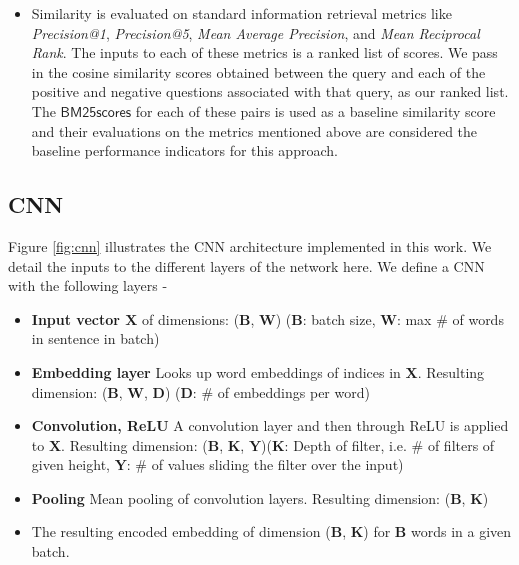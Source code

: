 \documentclass{sigkddExp}
\begin{document}
\begin{itemize}[topsep=0pt,itemsep=-1ex,partopsep=1ex,parsep=1ex]
  \item Similarity is evaluated on standard information retrieval metrics like \textit{Precision@1}, \textit{Precision@5}, \textit{Mean Average Precision}, and \textit{Mean Reciprocal Rank}. The inputs to each of these metrics is a ranked list of scores. We pass in the cosine similarity scores obtained between the query and each of the positive and negative questions associated with that query, as our ranked list. The $\mathsf{BM25 scores}$ for each of these pairs is used as a baseline similarity score and their evaluations on the metrics mentioned above are considered the baseline performance indicators for this approach.
\end{itemize}

\subsection{CNN}
Figure \ref{fig:cnn} illustrates the CNN architecture implemented in this work. We detail the inputs to the different layers of the network here.
We define a CNN with the following layers -
\begin{itemize}[topsep=0pt,itemsep=-1ex,partopsep=1ex,parsep=1ex]
\item \textbf{Input vector $\mathbf{X}$} of dimensions: ($\mathbf{B}$, $\mathbf{W}$) ($\mathbf{B}$: batch size, $\mathbf{W}$: max \# of words in sentence in batch)
\item \textbf{Embedding layer} Looks up word embeddings of indices in $\mathbf{X}$. Resulting dimension: ($\mathbf{B}$, $\mathbf{W}$, $\mathbf{D}$) ($\mathbf{D}$: \# of embeddings per word)
\item \textbf{Convolution, ReLU} A convolution layer and then through ReLU is applied to $\mathbf{X}$. Resulting dimension: ($\mathbf{B}$, $\mathbf{K}$, $\mathbf{Y}$)($\mathbf{K}$: Depth of filter, i.e. \# of filters of given height, $\mathbf{Y}$: \# of values sliding the filter over the input)
\item \textbf{Pooling} Mean pooling of convolution layers. Resulting dimension: ($\mathbf{B}$, $\mathbf{K}$)
\item The resulting encoded embedding of dimension ($\mathbf{B}$, $\mathbf{K}$) for $\mathbf{B}$ words in a given batch.
\end{itemize}
\end{document}
